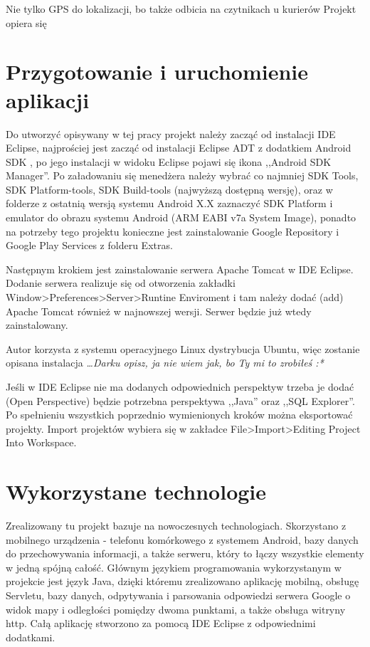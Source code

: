 \documentclass[eng,printmode,oneside]{mgr}
\begin{document}
 Nie tylko GPS do lokalizacji, bo także odbicia
na czytnikach u kurierów Projekt opiera się 

\chapter{Przygotowanie i uruchomienie aplikacji}

Do utworzyć opisywany w tej pracy projekt należy zacząć od instalacji IDE
Eclipse,  najprościej jest zacząć od instalacji Eclipse ADT z dodatkiem Android
SDK \cite{eclipse}, po jego instalacji w widoku Eclipse pojawi się ikona
,,Android SDK Manager''. Po załadowaniu się menedżera należy wybrać co najmniej
SDK Tools, SDK Platform-tools, SDK Build-tools (najwyższą dostępną wersję), oraz w
folderze z ostatnią wersją systemu Android X.X zaznaczyć SDK Platform i
emulator do obrazu systemu Android (ARM EABI v7a System Image), ponadto na
potrzeby tego projektu konieczne jest zainstalowanie Google Repository i Google
Play Services z folderu Extras.

Następnym krokiem jest zainstalowanie serwera Apache Tomcat w IDE Eclipse.
Dodanie serwera realizuje się od otworzenia zakładki
Window>Preferences>Server>Runtine Enviroment i tam należy dodać (add) Apache
Tomcat również w najnowszej wersji. Serwer będzie już wtedy zainstalowany. 

Autor korzysta z systemu operacyjnego Linux dystrybucja Ubuntu, więc zostanie
opisana instalacja \emph{\color{komentarz}\ldots Darku opisz, ja nie wiem jak,
bo Ty mi to zrobiłeś :*}

Jeśli w IDE Eclipse nie ma dodanych odpowiednich perspektyw trzeba je dodać
(Open Perspective) będzie potrzebna perspektywa ,,Java'' oraz ,,SQL Explorer''.
Po spełnieniu wszystkich poprzednio wymienionych kroków można eksportować
projekty. Import projektów wybiera się w zakładce File>Import>Editing Project
Into Workspace.

\chapter{Wykorzystane technologie}

Zrealizowany tu projekt bazuje na nowoczesnych technologiach.
Skorzystano z mobilnego urządzenia - telefonu komórkowego z systemem
Android, bazy danych do przechowywania informacji, a także serweru, który to
łączy wszystkie elementy w jedną spójną całość. Głównym językiem
programowania wykorzystanym w projekcie jest język Java, dzięki któremu
zrealizowano aplikację mobilną, obsługę Servletu, bazy danych, odpytywania i
parsowania odpowiedzi serwera Google o widok mapy i odległości pomiędzy dwoma
punktami, a także obsługa witryny http. Całą aplikację stworzono za pomocą IDE
Eclipse z odpowiednimi dodatkami.
\end{document}

